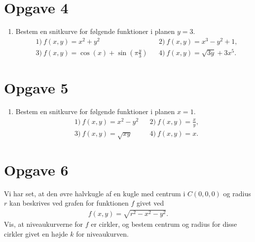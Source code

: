 \section*{Opgave 4}
\begin{enumerate}[label=\roman*)]
	\item Bestem en snitkurve for følgende funktioner i planen $y=3$.
	\begin{align*}
	&1) \ f(x,y) = x^2+y^2  &&2) \  f(x,y) = x^3-y^2+1,\\
	&3) \ f(x,y) = \cos(x)+\sin\left(\pi\frac{y}{3}\right)  &&4) \  f(x,y) = \sqrt{3y} + 3x^5.
	\end{align*}
\end{enumerate}

\section*{Opgave 5}

\begin{enumerate}[label=\roman*)]
	\item Bestem en snitkurve for følgende funktioner i planen $x=1$.
	\begin{align*}
	&1) \ f(x,y) = x^2-y^2  &&2) \  f(x,y) = \frac{x}{y},\\
	&3) \ f(x,y) = \sqrt{xy}  &&4) \  f(x,y) = x.
	\end{align*}
\end{enumerate}

\section*{Opgave 6}
Vi har set, at den øvre halvkugle af en kugle med centrum i $C(0,0,0)$ og radius $r$ kan beskrives ved grafen for funktionen $f$ givet ved
\begin{align*}
	f(x,y) = \sqrt{r^2-x^2-y^2}.
\end{align*}
Vis, at niveaukurverne for $f$ er cirkler, og bestem centrum og radius for disse cirkler givet en højde $k$ for niveaukurven. 